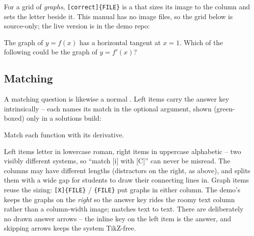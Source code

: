 For a grid of \emph{graphs}, \texttt{[correct]\{FILE\}} is a
 that sizes its image to the column and sets the letter beside it.
This manual has no image files, so the grid below is source-only; the live
version is  in the demo repo:

\begin{manexsource}
\begin{problem}
  The graph of $y = f(x)$ has a horizontal tangent at $x = 1$. Which of
  the following could be the graph of $y = f'(x)$?
  \begin{choices}[grid]
  \end{choices}
\end{problem}
\end{manexsource}

\subsection{Matching}

A matching question is likewise a normal . Left items carry the
answer key intrinsically -- each names its match in the optional argument, shown
(green-boxed) only in a solutions build:

\begin{manexample}
Match each function with its derivative.
\begin{matching}
  \rightcolumn
\end{matching}
\end{manexample}

Left items letter in lowercase roman, right items in uppercase alphabetic --
two visibly different systems, so ``match [i] with [C]'' can never be
misread. The columns may have different lengths (distractors on the right, as
above), and  splits them with a wide gap for students to draw
their connecting lines in. Graph items reuse the  sizing:
\texttt{[X]\{FILE\}} / \texttt{\{FILE\}} put
graphs in either column. The demo's  keeps the
graphs on the \emph{right} so the answer key rides the roomy text column rather
than a column-width image;  matches text to
text. There are deliberately no drawn answer arrows -- the inline key on the
left item is the answer, and skipping arrows keeps the system TikZ-free.

